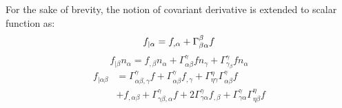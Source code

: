 For the sake of brevity, the notion of covariant derivative is extended to scalar function as:
\begin{equation}
f_{\vert\alpha} = f_{,\alpha} + \Gamma^\beta_{\beta\alpha} f \\
\end{equation}
\begin{equation}
f_{\vert\beta} n_\alpha = f_{,\beta}n_\alpha + \Gamma^\gamma_{\alpha\beta} f n_\gamma + \Gamma^\gamma_{\gamma_\beta} f n_\alpha
\end{equation}
\begin{equation}
\begin{split}
f_{\vert\alpha\beta} &=
\Gamma^\gamma_{\alpha\beta,\gamma}f + \Gamma^\gamma_{\alpha\beta} f_{,\gamma} + \Gamma^\eta_{\eta\gamma}\Gamma^\gamma_{\alpha\beta} f \\
&+ f_{,\alpha\beta} + \Gamma^\gamma_{\gamma\beta,\alpha}f+2\Gamma^\gamma_{\gamma\alpha}f_{,\beta} + \Gamma^{\gamma}_{\gamma\alpha}\Gamma^\eta_{\eta\beta} f
\end{split}
\end{equation}
